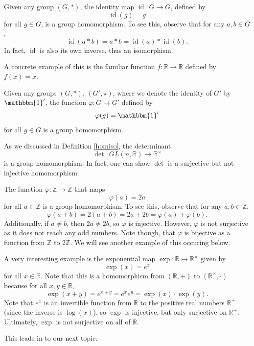 \documentclass{amsart}
\DeclareMathOperator{\id}{id}
\begin{document}
\begin{example}\label{identity-homomorphism}
   Given any group \((G, \ast)\), the identity map \(\id: G\to G\), defined by
	\[
	   \id(g) = g
	\]
	for all \(g\in G\), is a group homomorphism. To see this, observe that
	for any \(a, b\in G\),
	\[
	   \id(a\ast b) = a\ast b = \id(a)\ast\id(b).
	\]
	In fact, \(\id\) is also its own inverse, thus an isomorphism.

	A concrete example of this is the familiar function \(f:
	\mathbb{R}\to\mathbb{R}\) defined by \(f(x) = x\).
\end{example}

\begin{example}
	Given any groups \((G, \ast)\), \((G', \star)\), where we denote the
	identity of \(G'\) by \(\mathbbm{1}'\), the function \(\varphi:
	G\to G'\) defined by 
	\[
		\varphi(g) = \mathbbm{1}'
	\]
	for all \(g\in G\) is a group homomorphism.
\end{example}

\begin{example}\label{determinant-map}
	As we discussed in Definition \ref{homiso}, the determinant 
	\[
	   \det: GL(n, \mathbb{R})\to \mathbb{R}^\times
	\]
	is a group homomorphism. In fact, one can show \(\det\) is a surjective
	but not injective	homomorphism.
\end{example}

\begin{example}\label{2Z}
	 The function \(\varphi: \mathbb{Z}\to\mathbb{Z}\) that maps 
	 \[
	    \varphi(a) = 2a
	 \]
	 for all \(a\in \mathbb{Z}\) is a group homomorphism. To see this,
	 observe that for any \(a, b\in\mathbb{Z}\), 
	 \[
	    \varphi(a+b) = 2(a + b) = 2a + 2b = \varphi(a) + \varphi(b).
	 \]
	 Additionally, if \(a\ne b\), then \(2a\ne 2b\), so \(\varphi\) is
	 injective. However, \(\varphi\) is not surjective as it does not reach any
	 odd numbers. Note though, that \(\varphi\) is bijective as a function from
	 \(\mathbb{Z}\) to \(2\mathbb{Z}\). We will see another example of this
	 occuring below.
\end{example}

\begin{example}\label{exp}
	A very interesting example is the exponential map \(\exp: \mathbb{R}\mapsto
	\mathbb{R}^\times\) given by 
	\[
	   \exp(x) = e^x
	\] 
	for all \(x\in\mathbb{R}\). Note that this is a homomorphism from
	\((\mathbb{R}, +)\) to \((\mathbb{R}^\times, \cdot)\) because for all \(x,
	y\in\mathbb{R}\), 
	\[
		\exp(x + y) = e^{x + y} = e^xe^y = \exp(x)\cdot\exp(y).
	\]
	Note that \(e^x\) is an invertible function from \(\mathbb{R}\) to the
	positive	real numbers \(\mathbb{R}^+\) (since the inverse is \(\log(x)\)),
	so \(\exp\) is injective, but only surjective on \(\mathbb{R}^+\).
	Ultimately,	\(\exp\) is not surjective on all of \(\mathbb{R}\).

	This leads in to our next topic.
\end{example}
\end{document}
